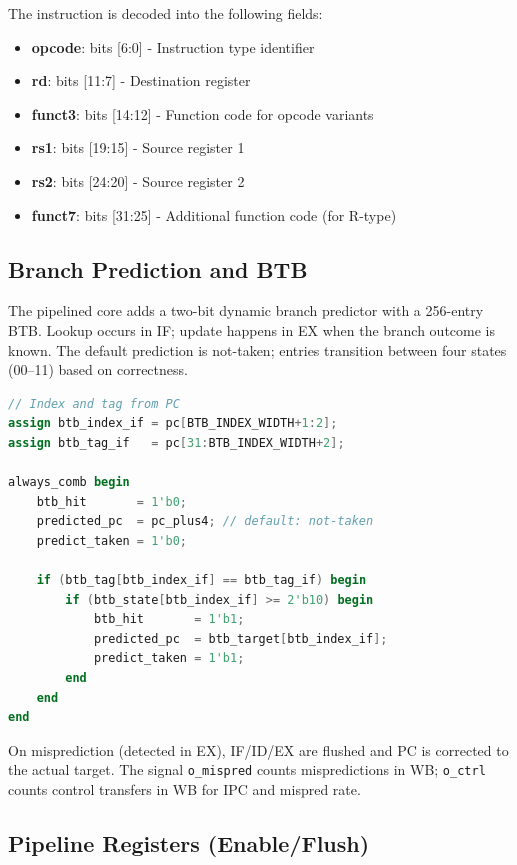 The instruction is decoded into the following fields:

\begin{itemize}
    \item \textbf{opcode}: bits [6:0] - Instruction type identifier
    \item \textbf{rd}: bits [11:7] - Destination register
    \item \textbf{funct3}: bits [14:12] - Function code for opcode variants
    \item \textbf{rs1}: bits [19:15] - Source register 1
    \item \textbf{rs2}: bits [24:20] - Source register 2
    \item \textbf{funct7}: bits [31:25] - Additional function code (for R-type)
\end{itemize}

\subsection{Branch Prediction and BTB}

The pipelined core adds a two-bit dynamic branch predictor with a 256-entry BTB. Lookup
occurs in IF; update happens in EX when the branch outcome is known. The default prediction
is not-taken; entries transition between four states (00--11) based on correctness.

\begin{lstlisting}[language=Verilog, caption=BTB lookup and prediction (pipelined.sv)]
// Index and tag from PC
assign btb_index_if = pc[BTB_INDEX_WIDTH+1:2];
assign btb_tag_if   = pc[31:BTB_INDEX_WIDTH+2];

always_comb begin
    btb_hit       = 1'b0;
    predicted_pc  = pc_plus4; // default: not-taken
    predict_taken = 1'b0;

    if (btb_tag[btb_index_if] == btb_tag_if) begin
        if (btb_state[btb_index_if] >= 2'b10) begin
            btb_hit       = 1'b1;
            predicted_pc  = btb_target[btb_index_if];
            predict_taken = 1'b1;
        end
    end
end
\end{lstlisting}

On misprediction (detected in EX), IF/ID/EX are flushed and PC is corrected to the actual
target. The signal \texttt{o\_mispred} counts mispredictions in WB; \texttt{o\_ctrl} counts control
transfers in WB for IPC and mispred rate.

\subsection{Pipeline Registers (Enable/Flush)}

